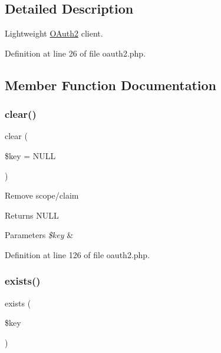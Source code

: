 \subsection{Detailed Description}
Lightweight \hyperlink{class_web_1_1_o_auth2}{O\+Auth2} client. 

Definition at line 26 of file oauth2.\+php.



\subsection{Member Function Documentation}
\hypertarget{class_web_1_1_o_auth2_a3afe9e27ee9d208e19b23b9e5ba2689a}{}\label{class_web_1_1_o_auth2_a3afe9e27ee9d208e19b23b9e5ba2689a} 
\subsubsection{\texorpdfstring{clear()}{clear()}}
{\footnotesize\ttfamily clear (\begin{DoxyParamCaption}\item[{}]{\$key = {\ttfamily NULL} }\end{DoxyParamCaption})}

Remove scope/claim \begin{DoxyReturn}{Returns}
N\+U\+LL 
\end{DoxyReturn}

\begin{DoxyParams}{Parameters}
{\em \$key} & \\
\hline
\end{DoxyParams}


Definition at line 126 of file oauth2.\+php.

\hypertarget{class_web_1_1_o_auth2_ace1ae5be37bf26c172cc7ea4e1a65e26}{}\label{class_web_1_1_o_auth2_ace1ae5be37bf26c172cc7ea4e1a65e26} 
\subsubsection{\texorpdfstring{exists()}{exists()}}
{\footnotesize\ttfamily exists (\begin{DoxyParamCaption}\item[{}]{\$key }\end{DoxyParamCaption})}

